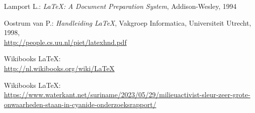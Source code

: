 
\begin{thebibliography}{99}

 Lamport L.: \emph{\LaTeX: A Document Preparation System}, Addison-Wesley, 1994 

 Oostrum van P.: \emph{Handleiding \LaTeX}, Vakgroep
  Informatica, Universiteit Utrecht, 1998,\\ 
  \url{http://people.cs.uu.nl/piet/latexhnd.pdf}

 Wikibooks \LaTeX:\\
  \url{http://nl.wikibooks.org/wiki/LaTeX}


 Wikibooks \LaTeX:\\
\url{https://www.waterkant.net/suriname/2023/05/29/milieuactivist-sleur-zeer-grote-onwaarheden-staan-in-cyanide-onderzoeksrapport/}

   



\end{thebibliography}
